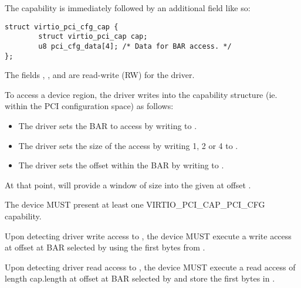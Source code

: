 The capability is immediately followed by an additional field like so:

\begin{lstlisting}
struct virtio_pci_cfg_cap {
        struct virtio_pci_cap cap;
        u8 pci_cfg_data[4]; /* Data for BAR access. */
};
\end{lstlisting}

The fields , ,  and
 are read-write (RW) for the driver.

To access a device region, the driver writes into the capability
structure (ie. within the PCI configuration space) as follows:

\begin{itemize}
\item The driver sets the BAR to access by writing to .

\item The driver sets the size of the access by writing 1, 2 or 4 to
  .

\item The driver sets the offset within the BAR by writing to
  .
\end{itemize}

At that point,  will provide a window of size
 into the given  at offset .


The device MUST present at least one VIRTIO_PCI_CAP_PCI_CFG capability.

Upon detecting driver write access
to , the device MUST execute a write access
at offset  at BAR selected by  using the first 
bytes from .

Upon detecting driver read access
to , the device MUST
execute a read access of length cap.length at offset 
at BAR selected by  and store the first  bytes in
.


